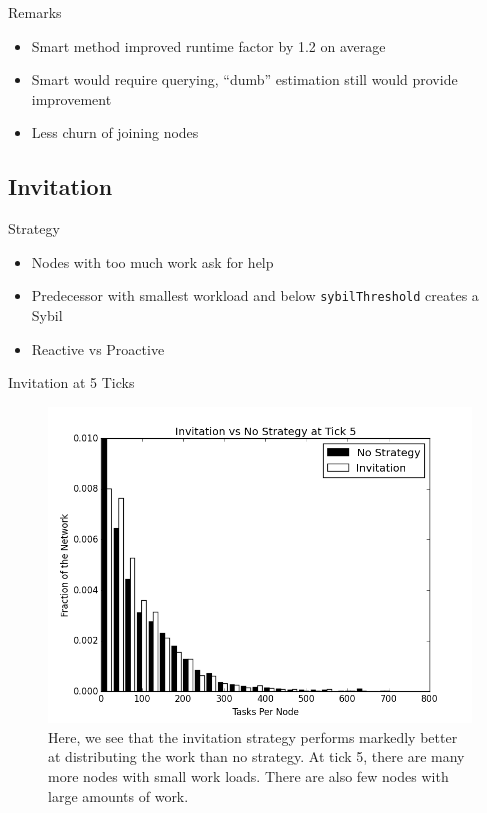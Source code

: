 \documentclass[11pt]{beamer}
\begin{document}
\begin{frame}{Remarks}
	\begin{itemize}
		\item Smart method improved runtime factor by 1.2 on average
		\item Smart would require querying, ``dumb'' estimation still would provide improvement
		\item Less churn of joining nodes
	\end{itemize}
\end{frame}

\subsection{Invitation}
\begin{frame}{Strategy}
	\begin{itemize}
		\item Nodes with too much work ask for help
		\item Predecessor with smallest workload and below \texttt{sybilThreshold} creates a Sybil
		\item Reactive vs Proactive
	\end{itemize}
\end{frame}



\begin{frame}{Invitation at 5 Ticks}
\begin{figure}
	\centering
	\includegraphics[width=0.7\linewidth]{figs/inviteStableHist5}
	\caption[Invitiation vs no strategy after 5 ticks]{Here, we see that the invitation strategy performs markedly better at distributing the work than no strategy.  At tick 5, there are many more nodes with small work loads.  There are also few nodes with large amounts of work.}
	\label{fig:inviteStableHist5}
\end{figure}

\end{frame}
\end{document}
